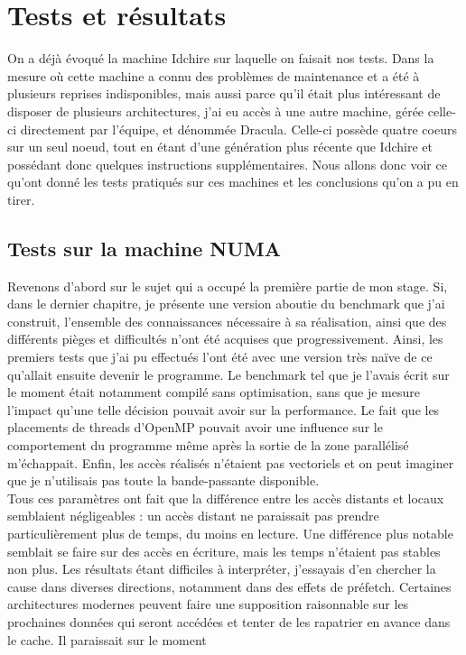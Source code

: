 \documentclass{report}
\begin{document}
\section{Tests et résultats}
On a déjà évoqué la machine Idchire sur laquelle on faisait nos tests. Dans la mesure où cette machine
a connu des problèmes de maintenance et a été à plusieurs reprises indisponibles, mais aussi parce qu'il
était plus intéressant de disposer de plusieurs architectures, j'ai eu accès à une autre machine, gérée
celle-ci directement par l'équipe, et dénommée Dracula. Celle-ci possède quatre coeurs sur un seul noeud,
tout en étant d'une génération plus récente que Idchire et possédant donc quelques instructions 
supplémentaires. Nous allons donc voir ce qu'ont donné les tests pratiqués sur ces machines et les
conclusions qu'on a pu en tirer.
\subsection{Tests sur la machine NUMA}
Revenons d'abord sur le sujet qui a occupé la première partie de mon stage. Si, dans le dernier chapitre,
je présente une version aboutie du benchmark que j'ai construit, l'ensemble des connaissances 
nécessaire à sa réalisation, ainsi que des différents pièges et difficultés n'ont été acquises que 
progressivement. Ainsi, les premiers tests que j'ai pu effectués l'ont été avec une version très naïve
de ce qu'allait ensuite devenir le programme. Le benchmark tel que je l'avais écrit sur le moment 
était notamment compilé sans optimisation, sans que je mesure l'impact qu'une telle décision pouvait
avoir sur la performance. Le fait que les placements de threads d'OpenMP pouvait avoir une influence
sur le comportement du programme même après la sortie de la zone parallélisé m'échappait. Enfin, les
accès réalisés n'étaient pas vectoriels et on peut imaginer que je n'utilisais pas toute la 
bande-passante disponible.
\\Tous ces paramètres ont fait que la différence entre les accès distants et locaux semblaient 
négligeables : un accès distant ne paraissait pas prendre particulièrement plus de temps, du moins
en lecture. Une différence plus notable semblait se faire sur des accès en écriture, mais les temps
n'étaient pas stables non plus. Les résultats étant difficiles à interpréter, j'essayais d'en 
chercher la cause dans diverses directions, notamment dans des effets de préfetch. Certaines 
architectures modernes peuvent faire une supposition raisonnable sur les prochaines données qui
seront accédées et tenter de les rapatrier en avance dans le cache. Il paraissait sur le moment
\end{document}
